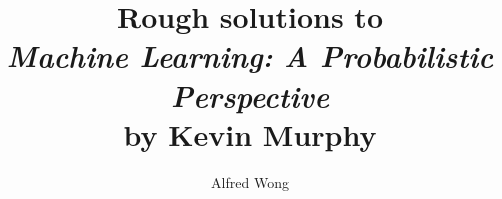 \documentclass{article}
\title{Rough solutions to\\\textit{Machine Learning: A Probabilistic Perspective}\\by Kevin Murphy}
\author{Alfred Wong}
\date{\vspace{-\baselineskip}}
\begin{document}
\maketitle
\pagebreak
\tableofcontents
\pagebreak





\end{document}
